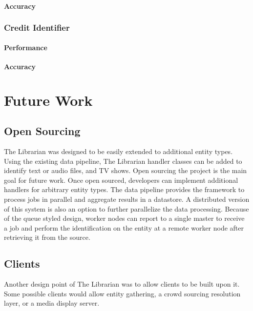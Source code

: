 \documentclass[paper=a4, fontsize=11pt]{scrartcl} %
\numberwithin{equation}{section} %
\numberwithin{figure}{section} %
\numberwithin{table}{section} %
\begin{document}
\paragraph{Accuracy}

\subsubsection{Credit Identifier}
\label{sec:credit-identifier-performance}

\paragraph{Performance}

\paragraph{Accuracy}





\section{Future Work}
\label{sec:future-work}

\subsection{Open Sourcing}
\label{sec:open-sourcing}
The Librarian was designed to be easily extended to additional entity types. Using the existing data pipeline, The Librarian handler classes can be added to identify text or audio files, and TV shows. Open sourcing the project is the main goal for future work. Once open sourced, developers can implement additional handlers for arbitrary entity types. The data pipeline provides the framework to process jobs in parallel and aggregate results in a datastore. A distributed version of this system is also an option to further parallelize the data processing. Because of the queue styled design, worker nodes can report to a single master to receive a job and perform the identification on the entity at a remote worker node after retrieving it from the source. \\

\subsection{Clients}
\label{sec:clients}
Another design point of The Librarian was to allow clients to be built upon it. Some possible clients would allow entity gathering, a crowd sourcing resolution layer, or a media display server. \\
\end{document}
